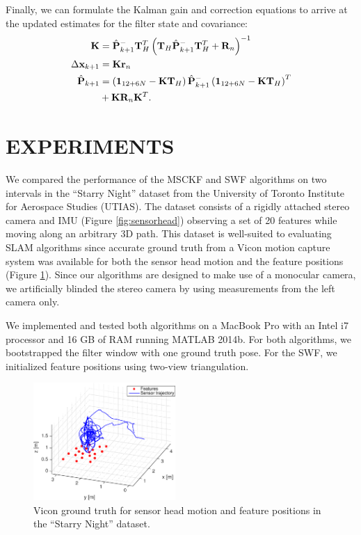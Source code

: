 \documentclass[letterpaper, 10 pt, conference]{ieeeconf}  %
\def\Vec#1{\mathbf{#1}}
\begin{document}
Finally, we can formulate the Kalman gain and correction equations to arrive at the updated estimates for the filter state and covariance:
\begin{align}
    \Vec{K} &= \hat{\Vec{P}}^-_{k+1}\Vec{T}_{H}^T\left(\Vec{T}_{H}\hat{\Vec{P}}^-_{k+1}\Vec{T}_{H}^T + \Vec{R}_{n} \right)^{-1} \\
    \Delta\Vec{x}_{k+1} &= \Vec{K}\Vec{r}_{n} \\
    \hat{\Vec{P}}_{k+1} &= \left(\Vec{1}_{12+6N} - \Vec{K}\Vec{T}_{H} \right)\hat{\Vec{P}}^-_{k+1}\left(\Vec{1}_{12+6N} - \Vec{K}\Vec{T}_{H} \right)^T \notag \\ 
                        &+ \Vec{K}\Vec{R}_{n}\Vec{K}^T .
\end{align}

\section{EXPERIMENTS} \label{sec:experiments}
We compared the performance of the MSCKF and SWF algorithms on two intervals in the ``Starry Night'' dataset from the University of Toronto Institute for Aerospace Studies (UTIAS).
The dataset consists of a rigidly attached stereo camera and IMU (Figure \ref{fig:sensorhead}) observing a set of 20 features while moving along an arbitrary 3D path.
This dataset is well-suited to evaluating SLAM algorithms since accurate ground truth from a Vicon motion capture system was available for both the sensor head motion and the feature positions (Figure \ref{fig:trajectory_groundtruth}).
Since our algorithms are designed to make use of a monocular camera, we artificially blinded the stereo camera by using measurements from the left camera only.

We implemented and tested both algorithms on a MacBook Pro with an Intel i7 processor and 16 GB of RAM running MATLAB 2014b.
For both algorithms, we bootstrapped the filter window with one ground truth pose.
For the SWF, we initialized feature positions using two-view triangulation.



\begin{figure}
    \centering
    \includegraphics[width=0.48\textwidth]{figs/trajectory_groundtruth}
    \caption{Vicon ground truth for sensor head motion and feature positions in the ``Starry Night'' dataset.}
    \label{fig:trajectory_groundtruth}
\end{figure}
\end{document}
